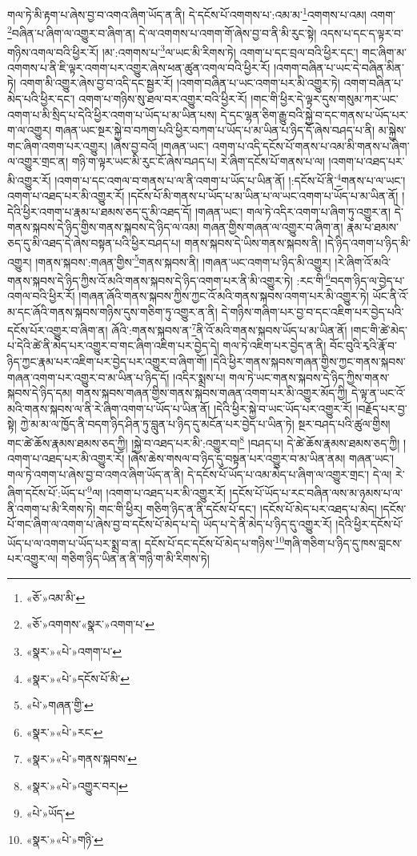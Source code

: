 གལ་ཏེ་མི་རྟག་པ་ཞེས་བྱ་བ་འགའ་ཞིག་ཡོད་ན་ནི། དེ་དངོས་པོ་འགགས་པ་:འམ་མ་\footnote{«ཅོ་»འམ་མི་}འགགས་པ་འམ། འགག་\footnote{«ཅོ་»འགགས་«སྣར་»འགག་པ་}བཞིན་པ་ཞིག་ལ་འགྱུར་བ་ཞིག་ན། དེ་ལ་འགགས་པ་འགག་གོ་ཞེས་བྱ་བ་ནི་མི་རུང་སྟེ། འདས་པ་དང་ད་ལྟར་བ་གཉིས་འགལ་བའི་ཕྱིར་རོ། །མ་:འགགས་པ་\footnote{«སྣར་»«པེ་»འགག་པ་}ལ་ཡང་མི་རིགས་ཏེ། འགག་པ་དང་བྲལ་བའི་ཕྱིར་དང་། གང་ཞིག་མ་འགགས་པ་ནི་ཇི་ལྟར་འགག་པར་འགྱུར་ཞེས་ཕན་ཚུན་འགལ་བའི་ཕྱིར་རོ། །འགག་བཞིན་པ་ཡང་དེ་བཞིན་མིན་ཏེ། འགག་མི་འགྱུར་ཞེས་བྱ་བ་འདི་དང་སྦྱར་རོ། །འགག་བཞིན་པ་ཡང་འགག་པར་མི་འགྱུར་ཏེ། འགག་བཞིན་པ་མེད་པའི་ཕྱིར་དང་། འགག་པ་གཉིས་སུ་ཐལ་བར་འགྱུར་བའི་ཕྱིར་རོ། །གང་གི་ཕྱིར་དེ་ལྟར་དུས་གསུམ་ཀར་ཡང་འགག་པ་མི་སྲིད་པ་དེའི་ཕྱིར་འགག་པ་ཡོད་པ་མ་ཡིན་པས། དེ་དང་ལྷན་ཅིག་རྒྱུ་བའི་སྐྱེ་བ་དང་གནས་པ་ཡོད་པར་ག་ལ་འགྱུར། གཞན་ཡང་སྔར་སྐྱེ་བ་བཀག་པའི་ཕྱིར་བཀག་པ་ཡོད་པ་མ་ཡིན་པ་ཉིད་དོ་ཞེས་བཤད་པ་ནི། མ་སྐྱེས་གང་ཞིག་འགག་པར་འགྱུར། །ཞེས་བྱ་བའོ། །གཞན་ཡང་། འགག་པ་འདི་དངོས་པོ་གནས་པ་འམ་མི་གནས་པ་ཞིག་ལ་འགྱུར་གྲང་ན། གཉི་ག་ལྟར་ཡང་མི་རུང་ངོ་ཞེས་བཤད་པ། རེ་ཞིག་དངོས་པོ་གནས་པ་ལ། །འགག་པ་འཐད་པར་མི་འགྱུར་རོ། །འགག་པ་དང་འགལ་བ་གནས་པ་ལ་ནི་འགག་པ་ཡོད་པ་ཡིན་ནོ། །:དངོས་པོ་ནི་\footnote{«སྣར་»«པེ་»དངོས་པོ་མི་}གནས་པ་ལ་ཡང་། འགག་པ་འཐད་པར་མི་འགྱུར་རོ། །དངོས་པོ་མི་གནས་པ་ཡོད་པ་མ་ཡིན་པ་ལ་ཡང་འགག་པ་ཡོད་པ་མ་ཡིན་ནོ། །དེའི་ཕྱིར་འགག་པ་རྣམ་པ་ཐམས་ཅད་དུ་མི་འཐད་དོ། །གཞན་ཡང་། གལ་ཏེ་འདིར་འགག་པ་ཞིག་ཏུ་འགྱུར་ན། དེ་གནས་སྐབས་དེ་ཉིད་གྱིས་གནས་སྐབས་དེ་ཉིད་ལ་འམ། གཞན་གྱིས་གཞན་ལ་འགྱུར་བ་ཞིག་ན། རྣམ་པ་ཐམས་ཅད་དུ་མི་འཐད་དེ་ཞེས་བསྟན་པའི་ཕྱིར་བཤད་པ། གནས་སྐབས་དེ་ཡིས་གནས་སྐབས་ནི། །དེ་ཉིད་འགག་པ་ཉིད་མི་འགྱུར། །གནས་སྐབས་:གཞན་གྱིས་\footnote{«པེ་»གཞན་གྱི་}གནས་སྐབས་ནི། །གཞན་ཡང་འགག་པ་ཉིད་མི་འགྱུར། །རེ་ཞིག་འོ་མའི་གནས་སྐབས་དེ་ཉིད་ཀྱིས་འོ་མའི་གནས་སྐབས་དེ་ཉིད་འགག་པར་ནི་མི་འགྱུར་ཏེ། :རང་གི་\footnote{«སྣར་»«པེ་»རང་}བདག་ཉིད་ལ་བྱེད་པ་འགལ་བའི་ཕྱིར་རོ། །གཞན་ཞོའི་གནས་སྐབས་ཀྱིས་ཀྱང་འོ་མའི་གནས་སྐབས་འགག་པར་མི་འགྱུར་ཏེ། ཡོང་ནི་འོ་མ་དང་ཞོའི་གནས་སྐབས་གཉིས་དུས་གཅིག་ཏུ་འགྱུར་ན་ནི། དེ་གཉིས་གཞིག་པར་བྱ་བ་དང་འཇིག་པར་བྱེད་པའི་དངོས་པོར་འགྱུར་བ་ཞིག་ན། ཞོའི་:གནས་སྐབས་ན་\footnote{«སྣར་»«པེ་»གནས་སྐབས་}ནི་འོ་མའི་གནས་སྐབས་ཡོད་པ་མ་ཡིན་ནོ། །གང་གི་ཚེ་མེད་པ་དེའི་ཚེ་ནི་མེད་པར་འགྱུར་བ་གང་ཞིག་འཇིག་པར་བྱེད་དེ། གལ་ཏེ་འཇིག་པར་བྱེད་ན་ནི། བོང་བུའི་རྭའི་རྣོ་བ་ཉིད་ཀྱང་རྣམ་པར་འཇིག་པར་བྱེད་པར་འགྱུར་བ་ཞིག་གོ། །དེའི་ཕྱིར་གནས་སྐབས་གཞན་གྱིས་ཀྱང་གནས་སྐབས་གཞན་འགག་པར་འགྱུར་བ་མ་ཡིན་པ་ཉིད་དོ། །འདིར་སྨྲས་པ། གལ་ཏེ་ཡང་གནས་སྐབས་དེ་ཉིད་ཀྱིས་གནས་སྐབས་དེ་ཉིད་དམ། གནས་སྐབས་གཞན་གྱིས་གནས་སྐབས་གཞན་འགག་པར་མི་འགྱུར་མོད་ཀྱི། དེ་ལྟ་ན་ཡང་འོ་མའི་གནས་སྐབས་ལ་ནི་རེ་ཞིག་འགག་པ་ཡོད་པ་ཡིན་ནོ། །དེའི་ཕྱིར་སྐྱེ་བ་ཡང་ཡོད་པར་འགྱུར་རོ། །བརྗོད་པར་བྱ་སྟེ། ཀྱེ་མ་མ་ལ་ཁྱོད་ནི་བདག་ཉིད་ཤིན་ཏུ་བླུན་པ་ཉིད་དུ་མངོན་པར་བྱེད་པ་ཡིན་ཏེ། སྔར་བཤད་པའི་ཚུལ་གྱིས། གང་ཚེ་ཆོས་རྣམས་ཐམས་ཅད་ཀྱི། །སྐྱེ་བ་འཐད་པར་མི་:འགྱུར་བ།\footnote{«སྣར་»«པེ་»འགྱུར་བར།} །བཤད་པ། དེ་ཚེ་ཆོས་རྣམས་ཐམས་ཅད་ཀྱི། །འགག་པ་འཐད་པར་མི་འགྱུར་རོ། །ཞེས་ཆེས་གསལ་བ་ཉིད་དུ་བསྟན་པར་འགྱུར་བ་མ་ཡིན་ནམ། གཞན་ཡང་། གལ་ཏེ་འགག་པ་ཞེས་བྱ་བ་འགའ་ཞིག་ཡོད་ན་ནི། དེ་དངོས་པོ་ཡོད་པ་འམ་མེད་པ་ཞིག་ལ་འགྱུར་གྲང་། དེ་ལ། རེ་ཞིག་དངོས་པོ་:ཡོད་པ་\footnote{«པེ་»ཡོད་}ལ། །འགག་པ་འཐད་པར་མི་འགྱུར་རོ། །དངོས་པོ་ཡོད་པ་རང་བཞིན་ལས་མ་ཉམས་པ་ལ་ནི་འགག་པ་མི་རིགས་ཏེ། གང་གི་ཕྱིར། གཅིག་ཉིད་ན་ནི་དངོས་པོ་དང་། །དངོས་པོ་མེད་པར་འཐད་པ་མེད། །དངོས་པོ་གང་ཞིག་ལ་འགག་པ་ཞེས་བྱ་བ་དངོས་པོ་མེད་པ་དེ། ཡོད་པ་དེ་ནི་མེད་པ་ཉིད་དུ་འགྱུར་རོ། །དེའི་ཕྱིར་དངོས་པོ་ཡོད་པ་ལ་འགག་པ་ཡོད་པར་སྨྲ་བ་ན། དངོས་པོ་དང་དངོས་པོ་མེད་པ་གཉིས་\footnote{«སྣར་»«པེ་»གཉི་}གཞི་གཅིག་པ་ཉིད་དུ་ཁས་བླངས་པར་འགྱུར་ལ། གཅིག་ཉིད་ཡིན་ན་ནི་གཉི་ག་མི་རིགས་ཏེ། 